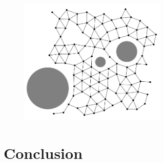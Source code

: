 \documentclass[10pt]{article}
\begin{document}
\begin{multicols}{2}
\begin{figure}[H]

  \centering

  \includegraphics[width=7cm]{obstacles.png}

  \caption{}
  \label{obstacles}

\end{figure}

\section{Conclusion}



\end{multicols}



\end{document}
